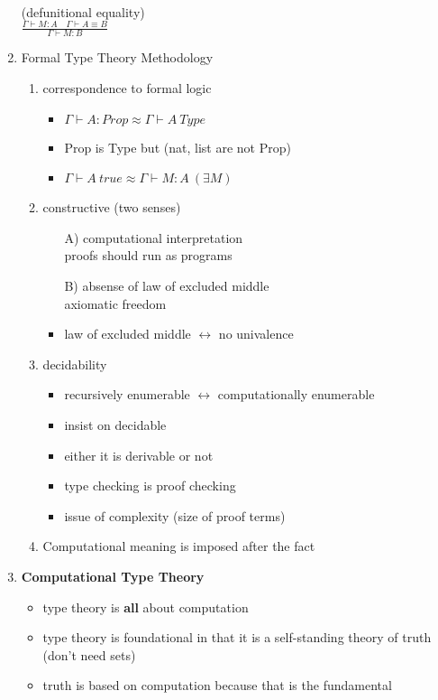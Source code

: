 \documentclass{article}
\begin{document}
\begin{enumerate}
\[\begin{array}{rclrcl}
\end{array}\]
(defunitional equality)\\
\vskip 0.1cm
$\displaystyle\frac{\Gamma \vdash M:A \quad \Gamma \vdash A\equiv B}
{\Gamma \vdash M:B}$
\item Formal Type Theory Methodology
\begin{enumerate}
\item correspondence to formal logic
\begin{itemize}
\item $\Gamma\vdash A:Prop \approx \Gamma\vdash A~Type$
\item Prop is Type but (nat, list are not Prop)
\item $\Gamma\vdash A~true \approx \Gamma\vdash M:A~(\exists M)$
\end{itemize}
\item constructive (two senses)
\begin{itemize}
\item[A)] computational interpretation\\
proofs should run as programs
\item[B)] absense of law of excluded middle\\
axiomatic freedom
\item law of excluded middle $\leftrightarrow$ no univalence
\end{itemize}
\item decidability
\begin{itemize}
\item recursively enumerable $\leftrightarrow$ computationally enumerable
\item insist on decidable
\item either it is derivable or not
\item type checking is proof checking
\item issue of complexity (size of proof terms)
\end{itemize}
\item Computational meaning is imposed after the fact
\end{enumerate}
\item {\bf Computational Type Theory}
\begin{itemize}
\item type theory is {\bf all} about computation
\item type theory is foundational in that it is a self-standing theory
of truth (don't need sets)
\item truth is based on computation because that is the fundamental

\end{itemize}
\end{enumerate}
\end{document}
